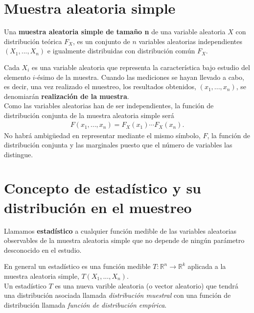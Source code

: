\section{Muestra aleatoria simple}

\begin{defi}
Una \textbf{muestra aleatoria simple de tamaño n} de una variable aleatoria $X$ con distribución teórica $F_X$, es un conjunto de $n$ variables aleatorias independientes $(X_1, ..., X_n)$ e igualmente distribuidas con distribución común $F_X$.
\end{defi}
Cada $X_i$ es una variable aleatoria que representa la característica bajo estudio del elemento $i$-ésimo de la muestra. Cuando las mediciones se hayan llevado a cabo, es decir, una vez realizado el muestreo, los resultados obtenidos, $(x_1, ..., x_n)$, se denomiarán \textbf{realización de la muestra}.
\\
\newline
Como las variables aleatorias han de ser independientes, la función de distribución conjunta de la muestra aleatoria simple será
\begin{align*}
    F(x_1,...,x_n) = F_X(x_1) \dotsb F_X(x_n).
\end{align*}
No habrá ambig\"uedad en representar mediante el mismo símbolo, $F$, la función de distribución conjunta y las marginales puesto que el número de variables las distingue.

\section{Concepto de estadístico y su distribución en el muestreo}

\begin{defi}
Llamamos \textbf{estadístico} a cualquier función medible de las variables aleatorias observables de la muestra aleatoria simple que no depende de ningún parámetro desconocido en el estudio.
\end{defi}

En general un estadístico es una función medible $T: \mathbb{R}^n \longrightarrow \mathbb{R}^k$ aplicada a la muestra aleatoria simple, $T(X_1, ..., X_n)$. 
\\
\newline
Un estadístico $T$ es una nueva varible aleatoria (o vector aleatorio) que tendrá una distribución asociada llamada \textit{distribución muestral} con una función de distribución llamada \textit{función de distribución empírica}.

